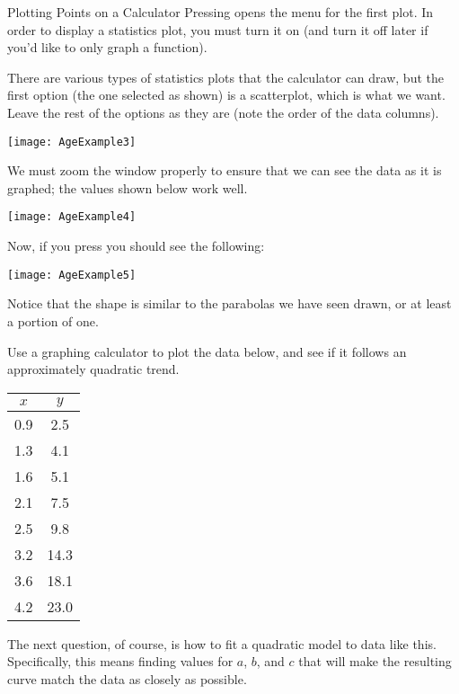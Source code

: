 \begin{example}[https://www.youtube.com/watch?v=N97Qj97Siec&list=PLfmpjsIzhztutjEb8Pg5OBOlI1p80yVoy&index=5]{Plotting Points on a Calculator}
Pressing  opens the menu for the first plot.  In order to display a statistics plot, you must turn it on (and turn it off later if you'd like to only graph a function).
\pagebreak

There are various types of statistics plots that the calculator can draw, but the first option (the one selected as shown) is a scatterplot, which is what we want.  Leave the rest of the options as they are (note the order of the data columns).

\begin{center}
\texttt{[image: AgeExample3]}
\end{center}

We must zoom the window properly to ensure that we can see the data as it is graphed; the values shown below work well.

\begin{center}
\texttt{[image: AgeExample4]}
\end{center}

Now, if you press  you should see the following:

\begin{center}
\texttt{[image: AgeExample5]}
\end{center}

Notice that the shape is similar to the parabolas we have seen drawn, or at least a portion of one.
\end{example}

\begin{try}
Use a graphing calculator to plot the data below, and see if it follows an approximately quadratic trend.
\begin{center}
\begin{tabular}{c c}
$x$ & $y$\\
\hline
0.9 & 2.5\\
1.3 & 4.1\\
1.6 & 5.1\\
2.1 & 7.5\\
2.5 & 9.8\\
3.2 & 14.3\\
3.6 & 18.1\\
4.2 & 23.0
\end{tabular}
\end{center}
\end{try}

The next question, of course, is how to fit a quadratic model to data like this.  Specifically, this means finding values for $a$, $b$, and $c$ that will make the resulting curve match the data as closely as possible.

